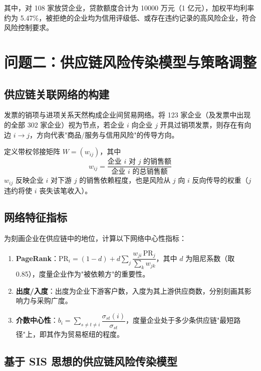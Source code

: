 \documentclass[12pt]{ctexart}
\begin{document}
其中，对 108 家放贷企业，贷款额度合计为 10000 万元（1 亿元），加权平均利率约为 5.47\%，被拒绝的企业均为信用评级低、或存在违约记录的高风险企业，符合风险控制要求。

\section{问题二：供应链风险传染模型与策略调整}

\subsection{供应链关联网络的构建}

发票的销项与进项关系天然构成企业间贸易网络。将 123 家企业（及发票中出现的全部 302 家企业）视为节点，若企业 $i$ 向企业 $j$ 开具过销项发票，则存在有向边 $i\rightarrow j$，方向代表"商品/服务与信用风险"的传导方向。

定义带权邻接矩阵 $W=(w_{ij})$，其中
\begin{equation}
w_{ij} = \frac{\text{企业 }i\text{ 对 }j\text{ 的销售额}}{\text{企业 }i\text{ 的总销售额}}
\end{equation}
$w_{ij}$ 反映企业 $i$ 对下游 $j$ 的销售依赖程度，也是风险从 $j$ 向 $i$ 反向传导的权重（$j$ 违约将使 $i$ 丧失该笔收入）。

\subsection{网络特征指标}

为刻画企业在供应链中的地位，计算以下网络中心性指标：

\begin{enumerate}[label=(\arabic*),itemsep=2pt]
    \item \textbf{PageRank}：$\mathrm{PR}_i = (1-d) + d\sum_{j}\dfrac{w_{ji}\,\mathrm{PR}_j}{\sum_k w_{jk}}$，其中 $d$ 为阻尼系数（取 0.85），度量企业作为"被依赖方"的重要性。
    \item \textbf{出度/入度}：出度为企业下游客户数，入度为其上游供应商数，分别刻画其影响力与采购广度。
    \item \textbf{介数中心性}：$b_i=\sum_{s\neq t\neq i}\dfrac{\sigma_{st}(i)}{\sigma_{st}}$，度量企业处于多少条供应链"最短路径"上，即其作为贸易枢纽的程度。
\end{enumerate}

\subsection{基于 SIS 思想的供应链风险传染模型}
\end{document}
